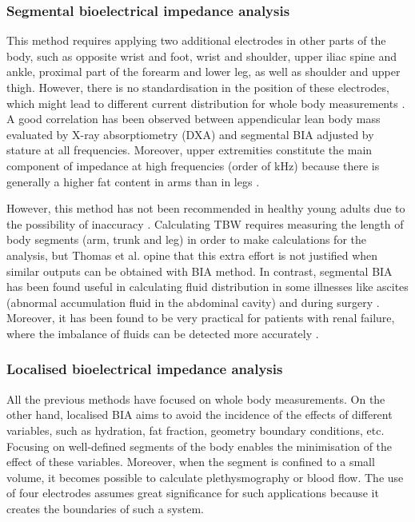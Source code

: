 \subsubsection{Segmental bioelectrical impedance analysis}
This method requires applying two additional electrodes in other parts of the body, such as opposite wrist and foot, wrist and shoulder, upper iliac spine and ankle, proximal part of the forearm and lower leg, as well as shoulder and upper thigh. However, there is no standardisation in the position of these electrodes, which might lead to different current distribution for whole body measurements \cite{kyle2004bioelectrical, woodrow1996segmental}. A good correlation has been observed between appendicular lean body mass evaluated by X-ray absorptiometry (DXA) and segmental BIA adjusted by stature at all frequencies. Moreover, upper extremities constitute the main component of impedance at high frequencies (order of \si{\kHz}) because there is generally a higher fat content in arms than in legs \cite{delorenzo2003segmental}. 

However, this method has not been recommended in healthy young adults due to the possibility of inaccuracy \cite{laforgia2008body,leahy2012comparison}. Calculating TBW requires measuring the length of body segments (arm, trunk and leg) in order to make calculations for the analysis, but Thomas et al. \cite{thomas2003comparison} opine that this extra effort is not justified when similar outputs can be obtained with BIA method. In contrast, segmental BIA has been found useful in calculating fluid distribution in some illnesses like ascites (abnormal accumulation fluid in the abdominal cavity) and during surgery \cite{kyle2004bioelectrical}. Moreover, it has been found to be very practical for patients with renal failure, where the imbalance of fluids can be detected more accurately \cite{woodrow1996segmental,thomas2003comparison}. 

\subsubsection{Localised bioelectrical impedance analysis}
All the previous methods have focused on whole body measurements. On the other hand, localised BIA aims to avoid the incidence of the effects of different variables, such as hydration, fat fraction, geometry boundary conditions, etc. Focusing on well-defined segments of the body enables the minimisation of the effect of these variables. Moreover, when the segment is confined to a small volume, it becomes possible to calculate plethysmography or blood flow. The use of four electrodes assumes great significance for such applications because it creates the boundaries of such a system. 

